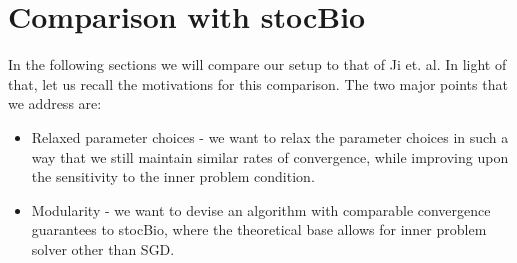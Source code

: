 \documentclass[11pt, twoside]{report}
\begin{document}




\section{Comparison with stocBio}
In the following sections we will compare our setup to that of Ji et. al. In light of that, let us recall the motivations for this comparison. The two major points that we address are:
\begin{itemize}
    \item Relaxed parameter choices - we want to relax the parameter choices in such a way that we still maintain similar rates of convergence, while improving upon the sensitivity to the inner problem condition.
    \item Modularity - we want to devise an algorithm with comparable convergence guarantees to stocBio, where the theoretical base allows for inner problem solver other than SGD.
\end{itemize}

\end{document}

